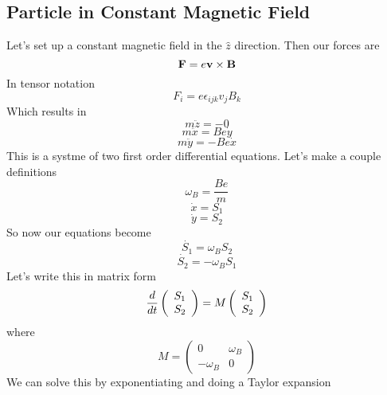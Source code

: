 \subsection{Particle in Constant Magnetic Field}
Let's set up a constant magnetic field in the $\hat{z}$ direction. Then our forces are 
\begin{equation}
\mathbf{F} = e\mathbf{v} \times \mathbf{B}
\end{equation}
In tensor notation
\begin{equation}
F_i = e \epsilon_{ijk} v_j B_k
\end{equation}
Which results in 
\begin{equation}
m\ddot{z} = -0
\end{equation}
\begin{equation}
m\ddot{x} = B e \dot{y}
\end{equation}
\begin{equation}
m\ddot{y} = -B e\dot{x}
\end{equation}
This is a systme of two first order differential equations. Let's make a couple definitions
\begin{equation}
\omega_B = \frac{Be}{m}
\end{equation}
\begin{equation}
\dot{x} = S_1
\end{equation}
\begin{equation}
\dot{y} = S_2
\end{equation}
So now our equations become
\begin{equation}
\dot{S_1} = \omega_B S_2
\end{equation}
\begin{equation}
\dot{S_2} = -\omega_B S_1
\end{equation}
Let's write this in matrix form
\begin{equation}
\frac{d }{d t} \left(\begin{array}{c} S_1 \\S_2\end{array}\right) = M \left(\begin{array}{c} S_1 \\S_2\end{array}\right)
\end{equation}
where
\begin{equation}
M = \left(\begin{array}{cc} 0 & \omega_B \\ -\omega_B & 0 \end{array}\right)
\end{equation}
We can solve this by exponentiating and doing a Taylor expansion




